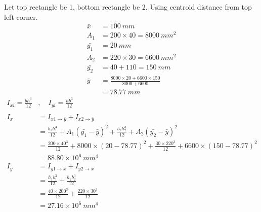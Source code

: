 \documentclass{article}
\begin{document}
Let top rectangle be 1, bottom rectangle be 2. Using centroid distance from top left corner.
\begin{align*}
    \bar{x}   & = 100\ mm                                      \\
    A_1       & = 200 \times 40 = 8000\ mm^2                   \\
    \bar{y_1} & = 20\ mm                                       \\
    A_2       & = 220 \times 30 = 6600\ mm^2                   \\
    \bar{y_2} & = 40 + 110 = 150\ mm                           \\
    \bar{y}   & = \frac{8000\times20+6600\times150}{8000+6600} \\
              & = 78.77\ mm
\end{align*}
\begin{align*}
    I_{xi}=\frac{bh^3}{12} & ,\quad I_{yi}=\frac{hb^3}{12}                                                                     \\
    \\
    I_x                    & = I_{x1\to\bar{y}} + I_{x2\to\bar{y}}                                                             \\
                           & = \frac{b_1h_1^3}{12}+A_1(\bar{y_1}-\bar{y})^2+\frac{b_2h_2^3}{12}+A_2(\bar{y_2}-\bar{y})^2       \\
                           & =\frac{200\times40^3}{12}+8000\times(20-78.77)^2+\frac{30\times220^3}{12}+6600\times(150-78.77)^2 \\
                           & = 88.80\times10^6\ mm^4                                                                           \\
    I_y                    & = I_{y1\to\bar{x}} + I_{y2\to\bar{x}}                                                             \\
                           & = \frac{h_1b_1^3}{12}+\frac{h_2b_2^3}{12}                                                         \\
                           & = \frac{40\times200^3}{12}+\frac{220\times30^3}{12}                                               \\
                           & = 27.16 \times10^6\ mm^4                                                                          \\
\end{align*}
\end{document}
